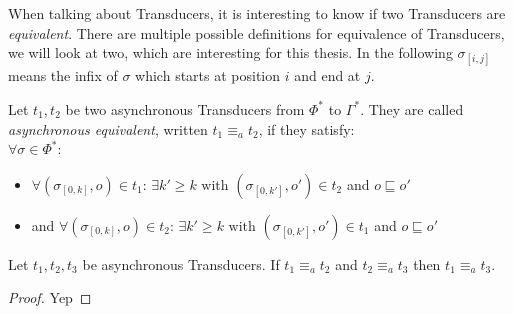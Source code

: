 When talking about Transducers, it is interesting to know if two Transducers are \emph{equivalent}.
There are multiple possible definitions for equivalence of Transducers, we will look at two, which are interesting for this thesis.
In the following \(\sigma_{[i,j]}\) means the infix of \(\sigma\) which starts at position \(i\) and end at \(j\).

\begin{definition}[name = Asynchronous equivalence of Transducers]\label{def:async_equivalence_transducer}
  Let \(t_1, t_2\) be two asynchronous Transducers from \(\Phi^*\) to \(\Gamma^*\).
  They are called \emph{asynchronous equivalent}, written \(t_1 \equiv_a t_2\), if they satisfy: \\
  \(\forall \sigma \in \Phi^*\):
  \begin{itemize}
    \item \(\forall (\sigma_{[0,k]}, o) \in t_1\): \(\exists k' \geq k \text{ with } (\sigma_{[0,k']}, o') \in t_2\) and \(o \sqsubseteq o'\)
    \item and \(\forall (\sigma_{[0,k]}, o) \in t_2\): \(\exists k' \geq k \text{ with } (\sigma_{[0,k']}, o') \in t_1\) and \(o \sqsubseteq o'\)
  \end{itemize}
\end{definition}

\begin{lemma}[name=Transitivity of asynchronous equivalence]\label{lemma:transitivity_async_equivalence}
  Let \(t_1, t_2, t_3\) be asynchronous Transducers.
  If \(t_1 \equiv_a t_2\) and \(t_2 \equiv_a t_3\) then \(t_1 \equiv_a t_3\).
\end{lemma}
\begin{proof}
  Yep
\end{proof}

